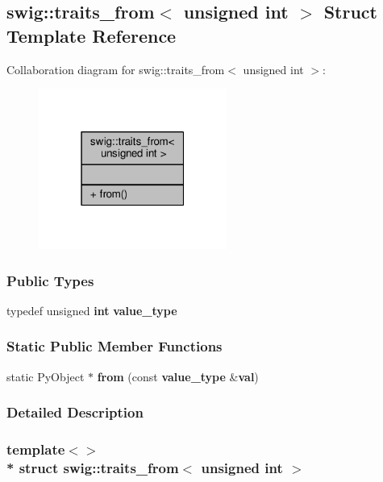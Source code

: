 \subsection{swig\+:\+:traits\+\_\+from$<$ unsigned int $>$ Struct Template Reference}
\label{structswig_1_1traits__from_3_01unsigned_01int_01_4}


Collaboration diagram for swig\+:\+:traits\+\_\+from$<$ unsigned int $>$\+:
\nopagebreak
\begin{figure}[H]
\begin{center}
\leavevmode
\includegraphics[width=175pt]{df/d9c/structswig_1_1traits__from_3_01unsigned_01int_01_4__coll__graph}
\end{center}
\end{figure}
\subsubsection*{Public Types}
\begin{DoxyCompactItemize}
\item 
typedef unsigned {\bf int} {\bf value\+\_\+type}
\end{DoxyCompactItemize}
\subsubsection*{Static Public Member Functions}
\begin{DoxyCompactItemize}
\item 
static Py\+Object $\ast$ {\bf from} (const {\bf value\+\_\+type} \&{\bf val})
\end{DoxyCompactItemize}


\subsubsection{Detailed Description}
\subsubsection*{template$<$$>$\\*
struct swig\+::traits\+\_\+from$<$ unsigned int $>$}



